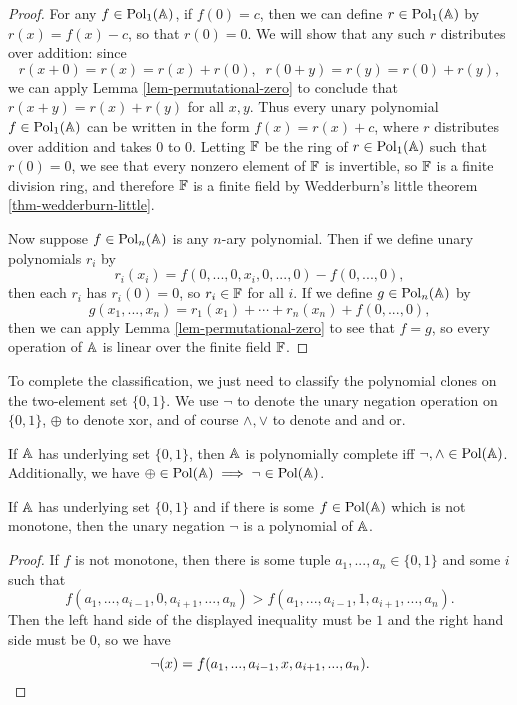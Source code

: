 \begin{appendices}
\begin{proof}
For any $f \in \operatorname{Pol}_1(\mathbb{A})$, if $f(0) = c$, then we can define $r \in \operatorname{Pol}_1(\mathbb{A})$ by $r(x) = f(x) - c$, so that $r(0) = 0$. We will show that any such $r$ distributes over addition: since
\[
r(x+0) = r(x) = r(x) + r(0), \;\; r(0+y) = r(y) = r(0) + r(y),
\]
we can apply Lemma \ref{lem-permutational-zero} to conclude that $r(x+y) = r(x) + r(y)$ for all $x,y$. Thus every unary polynomial $f \in \operatorname{Pol}_1(\mathbb{A})$ can be written in the form $f(x) = r(x) + c$, where $r$ distributes over addition and takes $0$ to $0$. Letting $\mathbb{F}$ be the ring of $r \in \operatorname{Pol}_1(\mathbb{A})$ such that $r(0) = 0$, we see that every nonzero element of $\mathbb{F}$ is invertible, so $\mathbb{F}$ is a finite division ring, and therefore $\mathbb{F}$ is a finite field by Wedderburn's little theorem \ref{thm-wedderburn-little}.

Now suppose $f \in \operatorname{Pol}_n(\mathbb{A})$ is any $n$-ary polynomial. Then if we define unary polynomials $r_i$ by
\[
r_i(x_i) = f(0, ..., 0, x_i, 0, ..., 0) - f(0, ..., 0),
\]
then each $r_i$ has $r_i(0) = 0$, so $r_i \in \mathbb{F}$ for all $i$. If we define $g \in \operatorname{Pol}_n(\mathbb{A})$ by
\[
g(x_1, ..., x_n) = r_1(x_1) + \cdots + r_n(x_n) + f(0, ..., 0),
\]
then we can apply Lemma \ref{lem-permutational-zero} to see that $f = g$, so every operation of $\mathbb{A}$ is linear over the finite field $\mathbb{F}$.
\end{proof}

To complete the classification, we just need to classify the polynomial clones on the two-element set $\{0,1\}$. We use $\neg$ to denote the unary negation operation on $\{0,1\}$, $\oplus$ to denote xor, and of course $\wedge, \vee$ to denote and and or.

\begin{prop} If $\mathbb{A}$ has underlying set $\{0,1\}$, then $\mathbb{A}$ is polynomially complete iff $\neg, \wedge \in \operatorname{Pol}(\mathbb{A})$. Additionally, we have $\oplus \in \operatorname{Pol}(\mathbb{A}) \implies \neg \in \operatorname{Pol}(\mathbb{A})$.
\end{prop}

\begin{lem}\label{lem-permutational-monotone} If $\mathbb{A}$ has underlying set $\{0,1\}$ and if there is some $f \in \operatorname{Pol}(\mathbb{A})$ which is not monotone, then the unary negation $\neg$ is a polynomial of $\mathbb{A}$.
\end{lem}
\begin{proof} If $f$ is not monotone, then there is some tuple $a_1, ..., a_n \in \{0,1\}$ and some $i$ such that
\[
f(a_1, ..., a_{i-1}, 0, a_{i+1}, ..., a_n) > f(a_1, ..., a_{i-1}, 1, a_{i+1}, ..., a_n).
\]
Then the left hand side of the displayed inequality must be $1$ and the right hand side must be $0$, so we have
\[
\neg(x) = f(a_1, ..., a_{i-1}, x, a_{i+1}, ..., a_n).\qedhere
\]
\end{proof}


\end{appendices}
